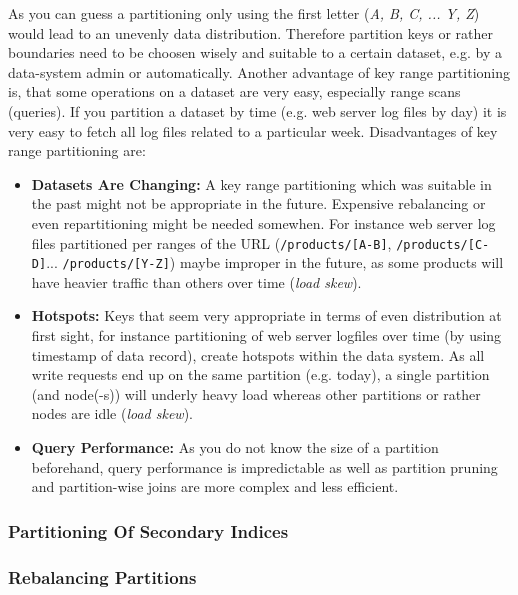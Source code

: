 {As you can guess a partitioning only using the first letter (\textit{A, B, C, ... Y, Z}) would lead to an unevenly data distribution. Therefore partition keys or rather boundaries need to be choosen wisely and suitable to a certain dataset, e.g. by a data-system admin or automatically. Another advantage of key range partitioning is, that some operations on a dataset are very easy, especially range scans (queries). If you partition a dataset by time (e.g. web server log files by day) it is very easy to fetch all log files related to a particular week.
Disadvantages of key range partitioning are:
\begin{itemize}
\item \textbf{Datasets Are Changing:} A key range partitioning which was suitable in the past might not be appropriate in the future. Expensive rebalancing or even repartitioning might be needed somewhen. For instance web server log files partitioned per ranges of the URL (\lstinline{/products/[A-B]}, \lstinline{/products/[C-D]}... \lstinline{/products/[Y-Z]}) maybe improper in the future, as some products will have heavier traffic than others over time (\textit{load skew}).
\item \textbf{Hotspots:} Keys that seem very appropriate in terms of even distribution at first sight, for instance partitioning of web server logfiles over time (by using timestamp of data record), create hotspots within the data system. As all write requests end up on the same partition (e.g. today), a single partition (and node(-s)) will underly heavy load whereas other partitions or rather nodes are idle (\textit{load skew}).
\item \textbf{Query Performance:} As you do not know the size of a partition beforehand, query performance is impredictable as well as partition pruning and partition-wise joins are more complex and less efficient.
\end{itemize}

\label{tf_dds_partitioning_key_value_hash_of_key}

\subsubsection{Partitioning Of Secondary Indices}
\label{tf_dds_partitioning_secondary_indices}

\subsubsection{Rebalancing Partitions}
\label{tf_dds_partitioning_rebalancing}

}
